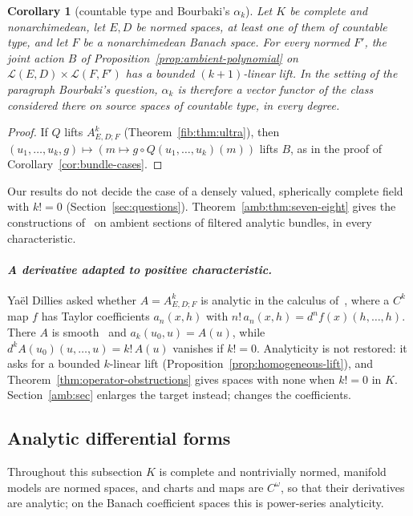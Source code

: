 \documentclass[11pt]{amsart}
\newtheorem{corollary}[theorem]{Corollary}
\theoremstyle{definition}
\theoremstyle{remark}
\numberwithin{equation}{section}
\newcommand{\cL}{\mathcal L}
\theoremstyle{plain}
\theoremstyle{definition}
\theoremstyle{plain}
\begin{document}
\begin{corollary}[countable type and Bourbaki's $\alpha_k$]\label{fib:cor:bourbaki}
Let $K$ be complete and nonarchimedean, let $E,D$ be normed spaces, at least one of them of countable type, and let
$F$ be a nonarchimedean Banach space. For every normed $F'$, the joint action $B$ of
Proposition~\ref{prop:ambient-polynomial} on $\cL(E,D)\times\cL(F,F')$ has a bounded $(k+1)$\nobreakdash-linear lift.
In the setting of the paragraph \emph{Bourbaki's question}, $\alpha_k$ is therefore a
vector functor of the class considered there on source spaces of countable type, in every degree.
\end{corollary}

\begin{proof}
If $Q$ lifts $A^k_{E,D;F}$ (Theorem~\ref{fib:thm:ultra}), then $(u_1,\dots,u_k,g)\mapsto(m\mapsto g\circ Q(u_1,\dots,u_k)(m))$
lifts $B$, as in the proof of Corollary~\ref{cor:bundle-cases}.
\end{proof}

Our results do not decide the case of a densely valued, spherically complete field with $k!=0$ (Section~\ref{sec:questions}). Theorem~\ref{amb:thm:seven-eight} gives the constructions of~\cite[n\textsuperscript{o}~7.8.1--7.8.4]{Bou} on ambient sections of filtered analytic bundles, in every characteristic.

\paragraph{\textit{A derivative adapted to positive characteristic.}}
Ya\"el Dillies asked whether $A=A^k_{E,D;F}$ is analytic in the calculus of~\cite[Definition~4.7 and Theorem~5.4]{BGN}, where a $C^k$ map $f$ has Taylor coefficients $a_n(x,h)$ with $n!\,a_n(x,h)=d^nf(x)(h,\ldots,h)$. There $A$ is smooth~\cite[Remark~4.2 and Lemma~10.1]{BGN} and $a_k(u_0,u)=A(u)$, while $d^kA(u_0)(u,\ldots,u)=k!\,A(u)$ vanishes if $k!=0$. Analyticity is not restored: it asks for a bounded $k$-linear lift (Proposition~\ref{prop:homogeneous-lift}), and Theorem~\ref{thm:operator-obstructions} gives spaces with none when $k!=0$ in $K$. Section~\ref{amb:sec} enlarges the target instead; \cite{II} changes the coefficients.

\subsection{Analytic differential forms}\label{sec:forms}

Throughout this subsection $K$ is complete and nontrivially normed, manifold models are normed spaces, and charts and maps are $C^\omega$, so that their derivatives are analytic; on the Banach coefficient spaces this is power-series analyticity.
\end{document}
